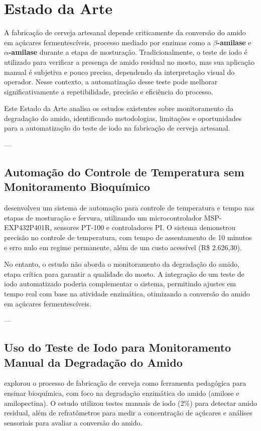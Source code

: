 \section{Estado da Arte}

A fabricação de cerveja artesanal depende criticamente da conversão do amido em açúcares fermentescíveis, processo mediado por enzimas como a \textbf{\(\beta\)-amilase} e \textbf{\(\alpha\)-amilase} durante a etapa de mosturação. Tradicionalmente, o teste de iodo é utilizado para verificar a presença de amido residual no mosto, mas sua aplicação manual é subjetiva e pouco precisa, dependendo da interpretação visual do operador. Nesse contexto, a automatização desse teste pode melhorar significativamente a repetibilidade, precisão e eficiência do processo.

Este Estado da Arte analisa os estudos existentes sobre monitoramento da degradação do amido, identificando metodologias, limitações e oportunidades para a automatização do teste de iodo na fabricação de cerveja artesanal.

---

\subsection{Automação do Controle de Temperatura sem Monitoramento Bioquímico}
\cite{parizotto2017} desenvolveu um sistema de automação para controle de temperatura e tempo nas etapas de mosturação e fervura, utilizando um microcontrolador MSP-EXP432P401R, sensores PT-100 e controladores PI. O sistema demonstrou precisão no controle de temperatura, com tempo de assentamento de 10 minutos e erro nulo em regime permanente, além de um custo acessível (R\$ 2.626,30).

No entanto, o estudo não aborda o monitoramento da degradação do amido, etapa crítica para garantir a qualidade do mosto. A integração de um teste de iodo automatizado poderia complementar o sistema, permitindo ajustes em tempo real com base na atividade enzimática, otimizando a conversão do amido em açúcares fermentescíveis.

---

\subsection{Uso do Teste de Iodo para Monitoramento Manual da Degradação do Amido}
\cite{almeida2024} explorou o processo de fabricação de cerveja como ferramenta pedagógica para ensinar bioquímica, com foco na degradação enzimática do amido (amilose e amilopectina). O estudo utilizou testes manuais de iodo (2\%) para detectar amido residual, além de refratômetros para medir a concentração de açúcares e análises sensoriais para avaliar a conversão do amido.

